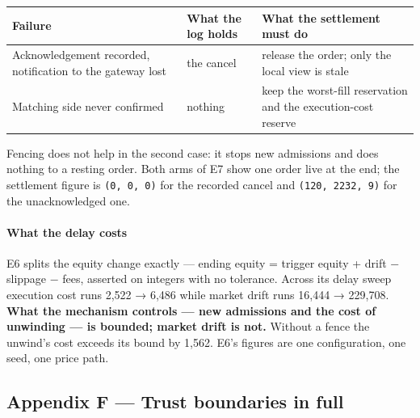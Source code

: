 \documentclass[10pt,a4paper]{article}
\newcounter{none}  %
\begin{document}
{\def\LTcaptype{none} %
\begin{longtable}[]{@{}
  >{\raggedright\arraybackslash}p{}
  >{\raggedright\arraybackslash}p{}
  >{\raggedright\arraybackslash}p{}@{}}
\toprule\noalign{}
\begin{minipage}[b]{\linewidth}\raggedright
Failure
\end{minipage} & \begin{minipage}[b]{\linewidth}\raggedright
What the log holds
\end{minipage} & \begin{minipage}[b]{\linewidth}\raggedright
What the settlement must do
\end{minipage} \\
\midrule\noalign{}
\endhead
\bottomrule\noalign{}
\endlastfoot
Acknowledgement recorded, notification to the gateway lost & the cancel & release the order; only the local view is stale \\
Matching side never confirmed & nothing & keep the worst-fill reservation and the execution-cost reserve \\
\end{longtable}
}

Fencing does not help in the second case: it stops new admissions and does
nothing to a resting order. Both arms of E7 show one order live at the end; the
settlement figure is \texttt{(0,\ 0,\ 0)} for the recorded cancel and \texttt{(120,\ 2232,\ 9)} for
the unacknowledged one.

\paragraph{What the delay costs}\label{what-the-delay-costs}

E6 splits the equity change exactly --- ending equity = trigger equity + drift −
slippage − fees, asserted on integers with no tolerance. Across its delay sweep
execution cost runs 2,522 → 6,486 while market drift runs 16,444 → 229,708. \textbf{What
the mechanism controls --- new admissions and the cost of unwinding --- is bounded;
market drift is not.} Without a fence the unwind's cost exceeds its bound by
1,562. E6's figures are one configuration, one seed, one price path.



\label{start:15}%

\subsection{Appendix F --- Trust boundaries in full}\label{appendix-f-trust-boundaries-in-full}
\end{document}

